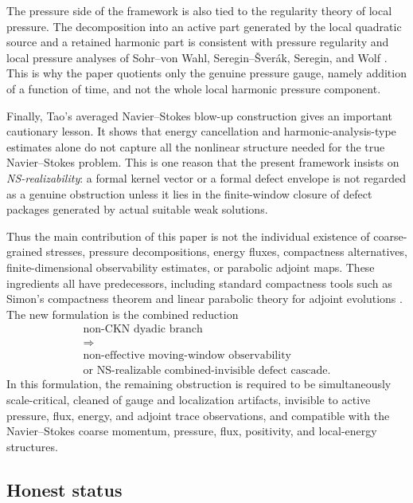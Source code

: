 \documentclass[11pt]{article}
\numberwithin{equation}{section}
\theoremstyle{plain}
\theoremstyle{definition}
\theoremstyle{remark}
\begin{document}
The pressure side of the framework is also tied to the regularity theory of local pressure.  The decomposition into an active part generated by the local quadratic source and a retained harmonic part is consistent with pressure regularity and local pressure analyses of Sohr--von Wahl, Seregin--\v{S}ver\'ak, Seregin, and Wolf \cite{SohrWahl1986,SereginSverak2002,Seregin2015,Wolf2017}.  This is why the paper quotients only the genuine pressure gauge, namely addition of a function of time, and not the whole local harmonic pressure component.

Finally, Tao's averaged Navier--Stokes blow-up construction \cite{Tao2016} gives an important cautionary lesson.  It shows that energy cancellation and harmonic-analysis-type estimates alone do not capture all the nonlinear structure needed for the true Navier--Stokes problem.  This is one reason that the present framework insists on \emph{NS-realizability}: a formal kernel vector or a formal defect envelope is not regarded as a genuine obstruction unless it lies in the finite-window closure of defect packages generated by actual suitable weak solutions.

Thus the main contribution of this paper is not the individual existence of coarse-grained stresses, pressure decompositions, energy fluxes, compactness alternatives, finite-dimensional observability estimates, or parabolic adjoint maps.  These ingredients all have predecessors, including standard compactness tools such as Simon's compactness theorem \cite{Simon1986} and linear parabolic theory for adjoint evolutions \cite{Amann1995,Lunardi1995}.  The new formulation is the combined reduction
\[
\boxed{
\begin{gathered}
\text{non-CKN dyadic branch} \\
\Longrightarrow \\
\text{non-effective moving-window observability} \\
\text{or NS-realizable combined-invisible defect cascade.}
\end{gathered}}
\]
In this formulation, the remaining obstruction is required to be simultaneously scale-critical, cleaned of gauge and localization artifacts, invisible to active pressure, flux, energy, and adjoint trace observations, and compatible with the Navier--Stokes coarse momentum, pressure, flux, positivity, and local-energy structures.

\subsection*{Honest status}
\end{document}

